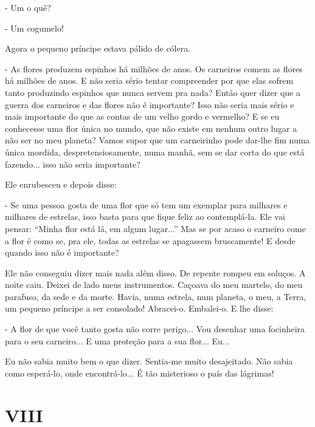 \begin{Parallel}[p]{}{}
{- Um o quê?

- Um cogumelo!

Agora o pequeno príncipe estava pálido de cólera.

- As flores produzem espinhos há milhões de anos. Os carneiros comem as
flores há milhões de anos. E não seria sério tentar compreender por que
elas sofrem tanto produzindo espinhos que nunca servem pra nada? Então
quer dizer que a guerra dos carneiros e das flores não é importante?
Isso não seria mais sério e mais importante do que as contas de um velho
gordo e vermelho? E se eu conhecesse uma flor única no mundo, que não
existe em nenhum outro lugar a não ser no meu planeta? Vamos supor que
um carneirinho pode dar-lhe fim numa única mordida, despretensiosamente,
numa manhã, sem se dar corta do que está fazendo... isso não seria
importante?

Ele enrubesceu e depois disse:

- Se uma pessoa gosta de uma flor que só tem um exemplar para milhares e
milhares de estrelas, isso basta para que fique feliz ao contemplá-la.
Ele vai pensar: ``Minha flor está lá, em algum lugar...'' Mas se por
acaso o carneiro come a flor é como se, pra ele, todas as estrelas se
apagassem bruscamente! E desde quando isso não é importante?

Ele não conseguiu dizer mais nada além disso. De repente rompeu em
soluços. A noite caiu. Deixei de lado meus instrumentos. Caçoava do meu
martelo, do meu parafuso, da sede e da morte. Havia, numa estrela, num
planeta, o meu, a Terra, um pequeno príncipe a ser consolado! Abracei-o.
Embalei-o. E lhe disse:

- A flor de que você tanto gosta não corre perigo... Vou desenhar uma
focinheira para o seu carneiro... E uma proteção para a sua flor...
Eu...

Eu não sabia muito bem o que dizer. Sentia-me muito desajeitado. Não
sabia como esperá-lo, onde encontrá-lo... É tão misterioso o país das
lágrimas!

}

\end{Parallel}











\chapter{VIII}

